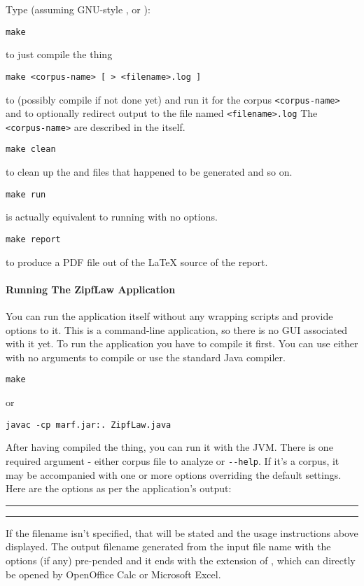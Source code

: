 Type (assuming GNU-style , or ):

\noindent
\verb+make+

	to just compile the thing

\noindent
\verb+make <corpus-name> [ > <filename>.log ]+

	to (possibly compile if not done yet) and run it for the corpus
	\verb+<corpus-name>+ and to optionally redirect output to the file
	named \verb+<filename>.log+
	The \verb+<corpus-name>+ are described in the  itself.

\noindent
\verb+make clean+

	to clean up the  and  files that happened to be
	generated and so on.

\noindent
\verb+make run+

	is actually equivalent to running  with no options.

\noindent
\verb+make report+

	to produce a PDF file out of the {\LaTeX} source of the report.

\paragraph{Running The ZipfLaw Application}
\label{sect:zipf-law-app}

You can run the application itself without any wrapping scripts
and provide options to it. This is a command-line application,
so there is no GUI associated with it yet. To run the application
you have to compile it first. You can use either  with no
arguments to compile or use the standard Java compiler.

\noindent
\verb+make+

or

\noindent
\verb+javac -cp marf.jar:. ZipfLaw.java+

\noindent
After having compiled the thing, you can run it with the JVM.
There is one required argument - either corpus file to analyze
or \verb+--help+. If it's a corpus, it
may be accompanied with one or more options overriding the default
settings. Here are the options as per the application's output:

\vspace{15pt}
\hrule

\hrule
\vspace{15pt}

If the filename isn't specified, that will be stated and the usage
instructions above displayed.
The output filename generated from the input file name with the
options (if any) pre-pended and it ends with the extension of ,
which can directly be opened by OpenOffice Calc or Microsoft Excel.

